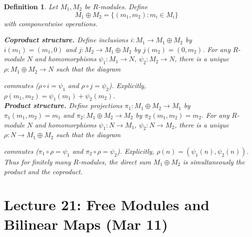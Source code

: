 \documentclass[a4paper,12pt]{article}
\newtheorem{defn}[thm]{Definition}
\begin{document}
\begin{defn}
    Let $M_1,M_2$ be $R$-modules. Define 
    \[
    M_1 \oplus M_2 = \{(m_1,m_2): m_i\in M_i\}
    \]
    with componentwise operations.

    \textbf{Coproduct structure.} Define inclusions $i:M_1\to M_1 \oplus M_2$ by $i(m_1)=(m_1,0)$ and $j:M_2\to M_1 \oplus M_2$ by $j(m_2)=(0,m_2)$. For any $R$-module $N$ and homomorphisms $\psi_1:M_1\to N$, $\psi_2:M_2\to N$, there is a unique $\rho:M_1\oplus M_2\to N$ such that the diagram
    \begin{center}
    \end{center}
    commutes ($\rho \circ i = \psi_1$ and $\rho \circ j = \psi_2$). Explicitly, $\rho(m_1,m_2)=\psi_1(m_1)+\psi_2(m_2)$.\\

    \textbf{Product structure.} Define projections $\pi_1:M_1 \oplus M_2\to M_1$ by $\pi_1(m_1,m_2)=m_1$ and $\pi_2:M_1 \oplus M_2\to M_2$ by $\pi_2(m_1,m_2)=m_2$. For any $R$-module $N$ and homomorphisms $\psi_1:N\to M_1$, $\psi_2:N\to M_2$, there is a unique $\rho:N\to M_1 \oplus M_2$ such that the diagram
    \begin{center}
    \end{center}
    commutes ($\pi_1\circ\rho = \psi_1$ and $\pi_2\circ\rho = \psi_2$). Explicitly, $\rho(n)=(\psi_1(n),\psi_2(n))$. Thus for finitely many $R$-modules, the direct sum $M_1\oplus M_2$ is simultaneously the product and the coproduct.
\end{defn}
\newpage
\section{Lecture 21: Free Modules and Bilinear Maps (Mar 11)}
\end{document}
